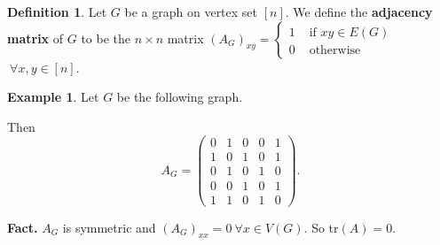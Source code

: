 \documentclass{article}
\theoremstyle{definition}
\newtheorem{example}{Example}[section]
\newtheorem{defn}{Definition}[section]
\begin{document}
\begin{defn}
    Let $G$ be a graph on vertex set $[n]$. We define the \textbf{adjacency matrix} of $G$ to be the $n\times n$ matrix $(A_G)_{xy} = \begin{cases}
        1 &\text{ if }xy \in E(G)\\
        0 &\text{ otherwise}
    \end{cases}$ $~\forall x,y \in [n]$.
\end{defn}
\begin{example}
    Let $G$ be the following graph.
    \begin{figure}[H]
        \centering
    \end{figure}
    Then \[
    A_G = \begin{pmatrix} 0&1&0&0&1\\1&0&1&0&1\\  0&1&0&1&0\\0&0&1&0&1\\1&1&0&1&0 \end{pmatrix}.
    \]
\end{example}

\textbf{Fact.} $A_G$ is symmetric and $(A_G)_{x x}=0 ~\forall x \in V(G)$. So $\text{tr}(A)=0$.
\vspace{1mm}
\end{document}
